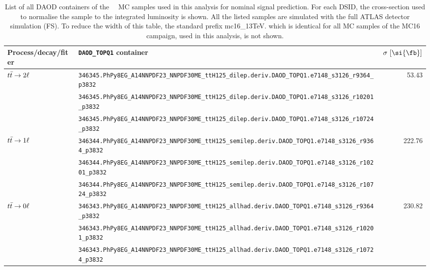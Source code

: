 \begin{table}[htbp]\centering
{\tiny
\begin{tabular}{l|l|r}
\toprule
\hline
Process/decay/fiter & \verb|DAOD_TOPQ1| container                                                    & $\mathrm{\sigma~[\si{\fb}]}$ \\ \hline\hline
\multirow{3}{*}{$t\bar{t}\to\mathrm{2\ell}$}     & \verb|346345.PhPy8EG_A14NNPDF23_NNPDF30ME_ttH125_dilep.deriv.DAOD_TOPQ1.e7148_s3126_r9364_p3832|    & \multirow{3}{*}{53.43} \\
                                               & \verb|346345.PhPy8EG_A14NNPDF23_NNPDF30ME_ttH125_dilep.deriv.DAOD_TOPQ1.e7148_s3126_r10201_p3832|   &  \\
                                               & \verb|346345.PhPy8EG_A14NNPDF23_NNPDF30ME_ttH125_dilep.deriv.DAOD_TOPQ1.e7148_s3126_r10724_p3832|   &  \\ \hline
\multirow{3}{*}{$t\bar{t}\to\mathrm{1\ell}$}     & \verb|346344.PhPy8EG_A14NNPDF23_NNPDF30ME_ttH125_semilep.deriv.DAOD_TOPQ1.e7148_s3126_r9364_p3832|  & \multirow{3}{*}{222.76} \\
                                               & \verb|346344.PhPy8EG_A14NNPDF23_NNPDF30ME_ttH125_semilep.deriv.DAOD_TOPQ1.e7148_s3126_r10201_p3832| &  \\
                                               & \verb|346344.PhPy8EG_A14NNPDF23_NNPDF30ME_ttH125_semilep.deriv.DAOD_TOPQ1.e7148_s3126_r10724_p3832| &  \\ \hline
\multirow{3}{*}{$t\bar{t}\to\mathrm{0\ell}$}     & \verb|346343.PhPy8EG_A14NNPDF23_NNPDF30ME_ttH125_allhad.deriv.DAOD_TOPQ1.e7148_s3126_r9364_p3832|   & \multirow{3}{*}{230.82} \\
                                               & \verb|346343.PhPy8EG_A14NNPDF23_NNPDF30ME_ttH125_allhad.deriv.DAOD_TOPQ1.e7148_s3126_r10201_p3832|  &  \\
                                               & \verb|346343.PhPy8EG_A14NNPDF23_NNPDF30ME_ttH125_allhad.deriv.DAOD_TOPQ1.e7148_s3126_r10724_p3832|  &  \\ \hline
\bottomrule
\end{tabular}}
  \caption{
    List of all DAOD containers of the \powhegboxpythia\ \ttH\ MC samples used in this analysis for nominal signal prediction.
    For each DSID, the cross-section used to normalise the sample to the integrated luminosity is shown.
    All the listed samples are simulated with the full ATLAS detector simulation (FS).
    To reduce the width of this table, the standard prefix \textsf{mc16\_13TeV.} which is identical for all MC samples of the MC16 campaign, used in this analysis, is not shown.
  }
  \label{tab:MC_samples_ttH_nominal}
\end{table}


